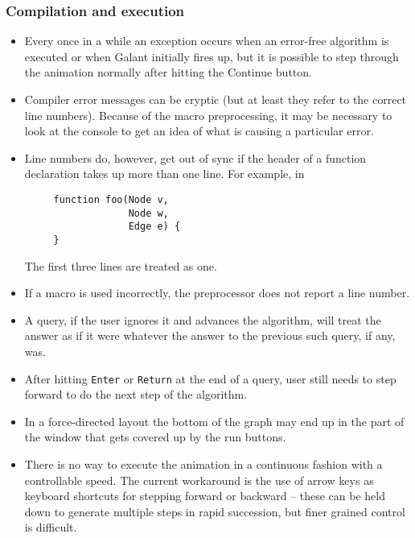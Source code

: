 \subsubsection*{Compilation and execution}

\begin{itemize}

\item Every once in a while an exception occurs when an error-free algorithm
  is executed or when Galant initially fires up, but it is possible to step
  through the animation normally after hitting the \textsf{Continue} button.

\item
  Compiler error messages can be cryptic (but at least they refer to the correct
  line numbers). Because of the macro preprocessing,
  it may be necessary to look at the console
  to get an idea of what is causing a particular error.

\item Line numbers do, however, get out of sync if the header of a function
  declaration takes up more than one line. For example, in
\begin{verbatim}
     function foo(Node v,
                  Node w,
                  Edge e) {
     }
\end{verbatim}
The first three lines are treated as one.

\item
  If a macro is used incorrectly,
  the preprocessor does not report a line number.

\item A query, if the user ignores it and advances the algorithm, will treat
  the answer as if it were whatever the answer to the previous such query, if
  any, was.

\item After hitting \texttt{Enter} or \texttt{Return} at the end of a query,
  user still needs to step forward to do the next step of the algorithm.

\item In a force-directed layout the bottom of the graph may end up in the
  part of the window that gets covered up by the run buttons.

\item
  There is no way to execute the animation in a continuous fashion with a
  controllable speed.
  The current workaround is the use of arrow keys as keyboard
  shortcuts for stepping forward or backward -- these can be held down to
  generate multiple steps in rapid succession, but finer grained control is
  difficult.

\end{itemize}


